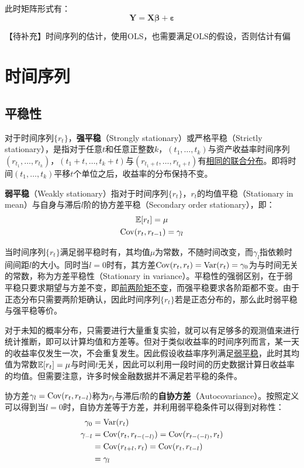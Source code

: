 \documentclass[11pt]{article}
\begin{document}
此时矩阵形式有：
\begin{equation*}
    \bm{Y} = \bm{X} \bm{\beta} + \bm{\varepsilon}
\end{equation*}

【待补充】时间序列的估计，使用OLS，也需要满足OLS的假设，否则估计有偏

\section{时间序列}

\subsection{平稳性}

对于时间序列$\{r_t\}$，\textbf{强平稳}（Strongly stationary）或严格平稳（Strictly stationary），是指对于任意$t$和任意正整数$k$，$(t_1,\dots,t_k)$与资产收益率时间序列$(r_{t_1},\dots,r_{t_k})$，$(t_1+t,\dots,t_k+t)$与$(r_{t_1+t},\dots,r_{t_k+t})$有\uline{相同的联合分布}。即将时间$(t_1,\dots,t_k)$平移$t$个单位之后，收益率的分布保持不变。

\textbf{弱平稳}（Weakly stationary）指对于时间序列$\{r_t\}$，$r_t$的均值平稳（Stationary in mean）与自身与滞后$l$阶的协方差平稳（Secondary order stationary），即：
\begin{gather*}
    \mathbb{E} [r_t] = \mu \\
    \operatorname{Cov} (r_t, r_{t-1}) = \gamma_l
\end{gather*}

当时间序列$\{r_t\}$满足弱平稳时有，其均值$\mu$为常数，不随时间改变，而$\gamma_l$指依赖时间间距$l$的大小。同时当$l=0$时有，其方差$\operatorname{Cov}(r_t,r_t) = \operatorname{Var}(r_t) = \gamma_0$为与时间无关的常数，称为方差平稳性（Stationary in variance）。平稳性的强弱区别，在于弱平稳只要求期望与方差不变，即\uline{前两阶矩不变}，而强平稳要求各阶距都不变。由于正态分布只需要两阶矩确认，因此时间序列$\{r_t\}$若是正态分布的，那么此时弱平稳与强平稳等价。

对于未知的概率分布，只需要进行大量重复实验，就可以有足够多的观测值来进行统计推断，即可以计算均值和方差等。但对于类似收益率的时间序列而言，某一天的收益率仅发生一次，不会重复发生。因此假设收益率序列满足\uline{弱平稳}，此时其均值为常数$\mathbb{E}[r_t] = \mu$与时间$t$无关，因此可以利用一段时间的历史数据计算日收益率的均值。但需要注意，许多时候金融数据并不满足若平稳的条件。

协方差$\gamma_l = \operatorname{Cov}(r_t,r_{t-l})$称为$r_t$与滞后$l$阶的\textbf{自协方差}（Autocovariance）。按照定义可以得到当$l=0$时，自协方差等于方差，并利用弱平稳条件可以得到对称性：
\begin{align*}
    \gamma_0 &= \operatorname{Var}(r_t) \\
    \gamma_{-l} &= \operatorname{Cov}(r_{t},r_{t-(-l)}) = \operatorname{Cov}(r_{t-(-l)},r_{t}) \\
    &= \operatorname{Cov}(r_{t+l},r_{t}) = \operatorname{Cov}(r_{t},r_{t-l}) \\
    &= \gamma_{l}
\end{align*}
\end{document}
